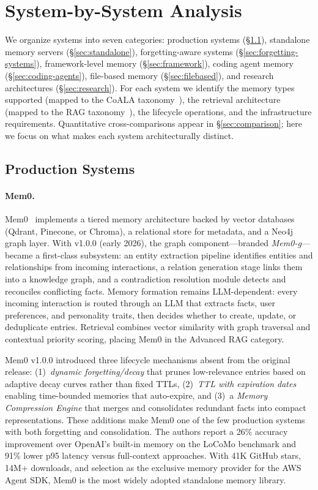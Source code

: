 \section{System-by-System Analysis}
\label{sec:systems}

We organize systems into seven categories: production systems
(\S\ref{sec:production}), standalone memory servers
(\S\ref{sec:standalone}), forgetting-aware systems
(\S\ref{sec:forgetting-systems}), framework-level memory
(\S\ref{sec:framework}), coding agent memory (\S\ref{sec:coding-agents}),
file-based memory (\S\ref{sec:filebased}), and research architectures
(\S\ref{sec:research}). For each system we identify the memory
types supported (mapped to the CoALA taxonomy~\cite{sumers2024coala}),
the retrieval architecture (mapped to the RAG
taxonomy~\cite{gao2023rag}), the lifecycle operations, and the
infrastructure requirements. Quantitative cross-comparisons appear in
\S\ref{sec:comparison}; here we focus on what makes each system
architecturally distinct.

\subsection{Production Systems}
\label{sec:production}

\paragraph{Mem0.}
Mem0~\cite{choudhary2025mem0} implements a tiered memory architecture
backed by vector databases (Qdrant, Pinecone, or Chroma), a relational
store for metadata, and a Neo4j graph layer.  With v1.0.0 (early 2026),
the graph component---branded \emph{Mem0-g}---became a first-class
subsystem: an entity extraction pipeline identifies entities and
relationships from incoming interactions, a relation generation stage
links them into a knowledge graph, and a contradiction resolution module
detects and reconciles conflicting facts.  Memory formation remains
LLM-dependent: every incoming interaction is routed through an LLM that
extracts facts, user preferences, and personality traits, then decides
whether to create, update, or deduplicate entries.  Retrieval combines
vector similarity with graph traversal and contextual priority scoring,
placing Mem0 in the Advanced RAG category.

Mem0 v1.0.0 introduced three lifecycle mechanisms absent from the
original release: (1)~\emph{dynamic forgetting/decay} that prunes
low-relevance entries based on adaptive decay curves rather than fixed
TTLs, (2)~\emph{TTL with expiration dates} enabling time-bounded
memories that auto-expire, and (3)~a \emph{Memory Compression Engine}
that merges and consolidates redundant facts into compact
representations.  These additions make Mem0 one of the few production
systems with both forgetting and consolidation.  The authors report a
26\% accuracy improvement over OpenAI's built-in memory on the LoCoMo
benchmark and 91\% lower p95 latency versus full-context approaches.
With 41K GitHub stars, 14M+ downloads, and selection as the exclusive
memory provider for the AWS Agent SDK, Mem0 is the most widely adopted
standalone memory library.

